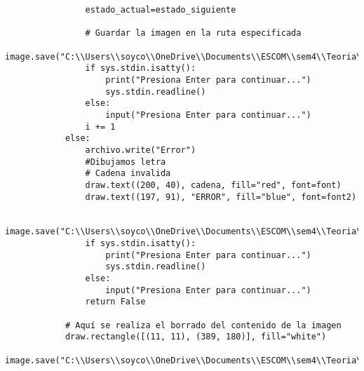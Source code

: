 \begin{lstlisting}
                estado_actual=estado_siguiente
                
                # Guardar la imagen en la ruta especificada
                image.save("C:\\Users\\soyco\\OneDrive\\Documents\\ESCOM\\sem4\\Teoria\\P2\\Prog4\\output\\animacion.png")
                if sys.stdin.isatty():
                    print("Presiona Enter para continuar...")
                    sys.stdin.readline()
                else:
                    input("Presiona Enter para continuar...")
                i += 1
            else:
                archivo.write("Error")
                #Dibujamos letra
                # Cadena invalida
                draw.text((200, 40), cadena, fill="red", font=font) 
                draw.text((197, 91), "ERROR", fill="blue", font=font2)
                
                image.save("C:\\Users\\soyco\\OneDrive\\Documents\\ESCOM\\sem4\\Teoria\\P2\\Prog4\\output\\animacion.png")
                if sys.stdin.isatty():
                    print("Presiona Enter para continuar...")
                    sys.stdin.readline()
                else:
                    input("Presiona Enter para continuar...")
                return False
            
            # Aquí se realiza el borrado del contenido de la imagen
            draw.rectangle([(11, 11), (389, 180)], fill="white")
            image.save("C:\\Users\\soyco\\OneDrive\\Documents\\ESCOM\\sem4\\Teoria\\P2\\Prog4\\output\\animacion.png")


\end{lstlisting}
